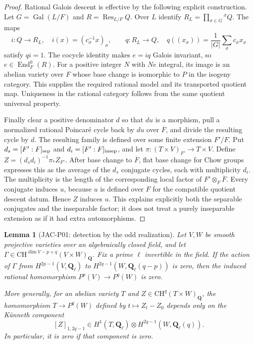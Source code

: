 \documentclass[11pt,a4paper]{article}
\newtheorem{lemma}[theorem]{Lemma}
\begin{document}
\begin{proof}
Rational Galois descent is effective by the following explicit
construction.  Let $G=\operatorname{Gal}(L/F)$ and
$R=\operatorname{Res}_{L/F}Q$.  Over $L$ identify
$R_L=\prod_{\sigma\in G}{}^\sigma Q$.  The maps
\[
 i:Q\longrightarrow R_L,\quad
 i(x)=(c_\sigma^{-1}x)_\sigma,
 \qquad
 q:R_L\longrightarrow Q,\quad
 q((x_\sigma))=\frac1{|G|}\sum_\sigma c_\sigma x_\sigma
\]
satisfy $qi=1$.  The cocycle identity makes $e=iq$ Galois invariant,
so $e\in\operatorname{End}^0_F(R)$.  For a positive integer $N$ with
$Ne$ integral, its image is an abelian variety over $F$ whose base
change is isomorphic to $P$ in the isogeny category.  This supplies the
required rational model and its transported quotient map.  Uniqueness
in the rational category follows from the same quotient universal
property.

Finally clear a positive denominator $d$ so that $du$ is a morphism,
pull a normalized rational Poincar\'e cycle back by $du$ over
$\overline F$, and divide the resulting cycle by $d$.
The resulting family is defined over some finite
extension $F'/F$.  Put $d_s=[F':F]_{\rm sep}$ and
$d_i=[F':F]_{\rm insep}$, and let
$\pi:(T\times V)_{F'}\to T\times V$.
Define $Z=(d_sd_i)^{-1}\pi_*Z_{F'}$.  After base change to
$\overline F$, flat base change for Chow groups expresses this as
the average of the $d_s$ conjugate cycles, each with multiplicity
$d_i$.  The multiplicity is the length of the corresponding local
factor of $F'\otimes_F\overline F$.  Every conjugate induces $u$,
because $u$ is defined over $F$ for the compatible quotient descent
datum.  Hence $Z$ induces $u$.  This explains explicitly both the
separable conjugates and the inseparable factor; it does not treat a
purely inseparable extension as if it had extra automorphisms.
\end{proof}

\begin{lemma}[JAC-P01: detection by the odd realization]
\label{jac:P01}
Let $V,W$ be smooth projective varieties over an algebraically closed
field, and let
$\Gamma\in\mathrm{CH}^{\dim V-p+q}(V\times W)_{\mathbf Q}$.
Fix a prime $\ell$ invertible in the field.  If the action of $\Gamma$
from $H^{2p-1}(V,\mathbf Q_\ell)$ to
$H^{2q-1}(W,\mathbf Q_\ell(q-p))$ is zero, then the induced rational
homomorphism $P^p(V)\longrightarrow P^q(W)$ is zero.

More generally, for an abelian variety $T$ and
$Z\in\mathrm{CH}^q(T\times W)_{\mathbf Q}$, the homomorphism
$T\longrightarrow P^q(W)$ defined by $t\mapsto Z_t-Z_0$ depends only
on the K\"unneth component
\[
 [Z]_{1,2q-1}\in H^1(T,\mathbf Q_\ell)\otimes
 H^{2q-1}(W,\mathbf Q_\ell(q)).
\]
In particular, it is zero if that component is zero.
\end{lemma}
\end{document}
